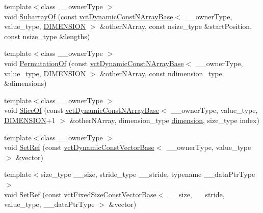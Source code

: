 \begin{DoxyCompactItemize}
\item 
{\footnotesize template$<$class \+\_\+\+\_\+owner\+Type $>$ }\\void \hyperlink{classvct_dynamic_const_n_array_ref_a3ddd714980f245701ccc03ab928a45f5}{Subarray\+Of} (const \hyperlink{classvct_dynamic_const_n_array_base}{vct\+Dynamic\+Const\+N\+Array\+Base}$<$ \+\_\+\+\_\+owner\+Type, value\+\_\+type, \hyperlink{group__cisst_vector_ggae8d52484153d181fd3ac08be58589848ae003ed9f88ed51f50c6c180506995b93}{D\+I\+M\+E\+N\+S\+I\+O\+N} $>$ \&other\+N\+Array, const nsize\+\_\+type \&start\+Position, const nsize\+\_\+type \&lengths)
\item 
{\footnotesize template$<$class \+\_\+\+\_\+owner\+Type $>$ }\\void \hyperlink{classvct_dynamic_const_n_array_ref_a5bf9a093c9d83b0c804fa3a2ce1bee8b}{Permutation\+Of} (const \hyperlink{classvct_dynamic_const_n_array_base}{vct\+Dynamic\+Const\+N\+Array\+Base}$<$ \+\_\+\+\_\+owner\+Type, value\+\_\+type, \hyperlink{group__cisst_vector_ggae8d52484153d181fd3ac08be58589848ae003ed9f88ed51f50c6c180506995b93}{D\+I\+M\+E\+N\+S\+I\+O\+N} $>$ \&other\+N\+Array, const ndimension\+\_\+type \&dimensions)
\item 
{\footnotesize template$<$class \+\_\+\+\_\+owner\+Type $>$ }\\void \hyperlink{classvct_dynamic_const_n_array_ref_ac5282c351ce31111cd45ecf51fddd3a1}{Slice\+Of} (const \hyperlink{classvct_dynamic_const_n_array_base}{vct\+Dynamic\+Const\+N\+Array\+Base}$<$ \+\_\+\+\_\+owner\+Type, value\+\_\+type, \hyperlink{group__cisst_vector_ggae8d52484153d181fd3ac08be58589848ae003ed9f88ed51f50c6c180506995b93}{D\+I\+M\+E\+N\+S\+I\+O\+N}+1 $>$ \&other\+N\+Array, dimension\+\_\+type \hyperlink{classvct_dynamic_const_n_array_base_aad976ad48dc9b1006d9e2729195f0b7c}{dimension}, size\+\_\+type index)
\item 
{\footnotesize template$<$class \+\_\+\+\_\+owner\+Type $>$ }\\void \hyperlink{classvct_dynamic_const_n_array_ref_a03ec58ff322633fa30341c454741e0bc}{Set\+Ref} (const \hyperlink{classvct_dynamic_const_vector_base}{vct\+Dynamic\+Const\+Vector\+Base}$<$ \+\_\+\+\_\+owner\+Type, value\+\_\+type $>$ \&vector)
\item 
{\footnotesize template$<$size\+\_\+type \+\_\+\+\_\+size, stride\+\_\+type \+\_\+\+\_\+stride, typename \+\_\+\+\_\+data\+Ptr\+Type $>$ }\\void \hyperlink{classvct_dynamic_const_n_array_ref_afe01d1a7c0788bfc61ea56e418475809}{Set\+Ref} (const \hyperlink{classvct_fixed_size_const_vector_base}{vct\+Fixed\+Size\+Const\+Vector\+Base}$<$ \+\_\+\+\_\+size, \+\_\+\+\_\+stride, value\+\_\+type, \+\_\+\+\_\+data\+Ptr\+Type $>$ \&vector)

\end{DoxyCompactItemize}
